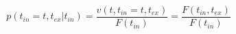 \begin{equation}
p(t_{in}=t,t_{ex}|t_{in})  = \frac{v(t,t_{in}=t,t_{ex})}{F(t_{in})}= \frac{F(t_{in},t_{ex})}{F(t_{in})}
\end{equation}